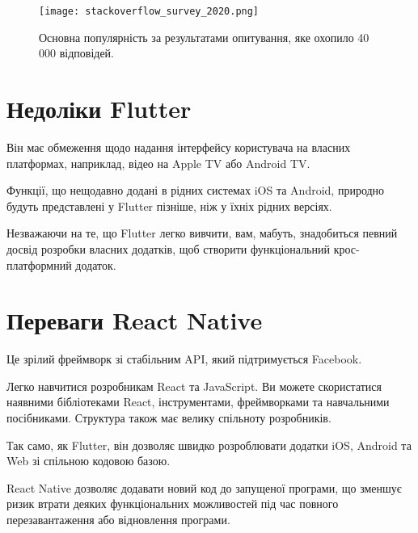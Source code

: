 \begin{figure}
    \label{fig:stackoverflow_survey_2020}
    \begin{center}
        \texttt{[image: stackoverflow\_survey\_2020.png]}
    \end{center}

    Основна популярність за результатами опитування, яке охопило 40 000 відповідей.
    \cite{stackoverflow_survey_2020}
\end{figure}


\section{Недоліки Flutter}
\label{sec:flutter_cons}
\begin{enumerate}
    \begin{item}
        Він має обмеження щодо надання інтерфейсу користувача на власних платформах, наприклад, відео на Apple TV або Android TV.
    \end{item}
    \begin{item}
        Функції, що нещодавно додані в рідних системах iOS та Android, природно будуть представлені у Flutter пізніше, ніж у їхніх рідних версіях.
    \end{item}
    \begin{item}
        Незважаючи на те, що Flutter легко вивчити, вам, мабуть, знадобиться певний досвід розробки власних додатків, щоб створити функціональний крос-платформний додаток.
    \end{item}
\end{enumerate}


\section{Переваги React Native}
\label{sec:rn_pros}
\begin{enumerate}
    \begin{item}
        Це зрілий фреймворк зі стабільним API, який підтримується Facebook.
    \end{item}
    \begin{item}
        Легко навчитися розробникам React та JavaScript.
        Ви можете скористатися наявними бібліотеками React, інструментами, фреймворками та навчальними посібниками.
        Структура також має велику спільноту розробників.
    \end{item}
    \begin{item}
        Так само, як Flutter, він дозволяє швидко розроблювати додатки iOS, Android та Web зі спільною кодовою базою.
    \end{item}
    \begin{item}
        React Native дозволяє додавати новий код до запущеної програми, що зменшує ризик втрати деяких функціональних можливостей під час повного перезавантаження або відновлення програми.
    \end{item}
\end{enumerate}


